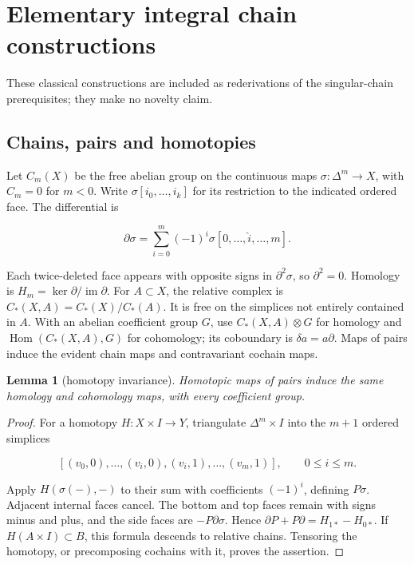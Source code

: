 \documentclass[11pt]{article}
\newtheorem{lemma}[theorem]{Lemma}
\begin{document}
\section{Elementary integral chain constructions}
\label{mapsI:chain:section}

These classical constructions are included as rederivations of the singular-chain prerequisites; they make no novelty claim.

\subsection{Chains, pairs and homotopies}
\label{mapsI:chain:section-1}

Let \(C_m(X)\) be the free abelian group on the continuous maps \(\sigma:\Delta^m\to X\), with \(C_m=0\) for \(m<0\). Write \(\sigma[i_0,\ldots,i_k]\) for its restriction to the indicated ordered face. The differential is

\[
\partial\sigma=\sum_{i=0}^m(-1)^i\sigma[0,\ldots,\widehat i,\ldots,m].
\]

Each twice-deleted face appears with opposite signs in \(\partial^2\sigma\), so \(\partial^2=0\). Homology is \(H_m=\ker\partial/\operatorname{im}\partial\). For \(A\subset X\), the relative complex is \(C_*(X,A)=C_*(X)/C_*(A)\). It is free on the simplices not entirely contained in \(A\). With an abelian coefficient group \(G\), use \(C_*(X,A)\otimes G\) for homology and \(\operatorname{Hom}(C_*(X,A),G)\) for cohomology; its coboundary is \(\delta a=a\partial\). Maps of pairs induce the evident chain maps and contravariant cochain maps.

\begin{lemma}[homotopy invariance]
\label{mapsI:chain:lemma:1.1}
Homotopic maps of pairs induce the same homology and cohomology maps, with every coefficient group.
\end{lemma}

\begin{proof}
For a homotopy \(H:X\times I\to Y\), triangulate \(\Delta^m\times I\) into the \(m+1\) ordered simplices

\[
[(v_0,0),\ldots,(v_i,0),(v_i,1),\ldots,(v_m,1)],
\qquad 0\leq i\leq m.
\]

Apply \(H(\sigma(-),-)\) to their sum with coefficients \((-1)^i\), defining \(P\sigma\). Adjacent internal faces cancel. The bottom and top faces remain with signs minus and plus, and the side faces are \(-P\partial\sigma\). Hence
\(\partial P+P\partial=H_{1*}-H_{0*}\).
If \(H(A\times I)\subset B\), this formula descends to relative chains. Tensoring the homotopy, or precomposing cochains with it, proves the assertion.
\end{proof}
\end{document}
